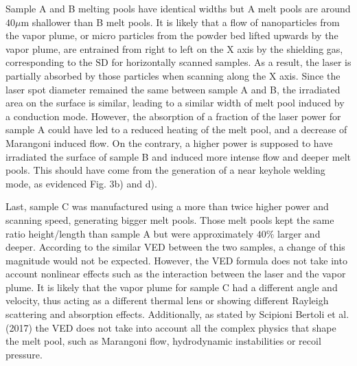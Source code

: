 \documentclass[10pt]{article}
\begin{document}
Sample A and B melting pools have identical widths but A melt pools are around $40 \mu \mathrm{m}$ shallower than B melt pools. It is likely that a flow of nanoparticles from the vapor plume, or micro particles from the powder bed lifted upwards by the vapor plume, are entrained from right to left on the $\mathrm{X}$ axis by the shielding gas, corresponding to the $\mathrm{SD}$ for horizontally scanned samples. As a result, the laser is partially absorbed by those particles when scanning along the $\mathrm{X}$ axis. Since the laser spot diameter remained the same between sample A and B, the irradiated area on the surface is similar, leading to a similar width of melt pool induced by a conduction mode. However, the absorption of a fraction of the laser power for sample A could have led to a reduced heating of the melt pool, and a decrease of Marangoni induced flow. On the contrary, a higher power is supposed to have irradiated the surface of sample B and induced more intense flow and deeper melt pools. This should have come from the generation of a near keyhole welding mode, as evidenced Fig. 3b) and d).

Last, sample $\mathrm{C}$ was manufactured using a more than twice higher power and scanning speed, generating bigger melt pools. Those melt pools kept the same ratio height/length than sample A but were approximately $40 \%$ larger and deeper. According to the similar VED between the two samples, a change of this magnitude would not be expected. However, the VED formula does not take into account nonlinear effects such as the interaction between the laser and the vapor plume. It is likely that the vapor plume for sample $\mathrm{C}$ had a different angle and velocity, thus acting as a different thermal lens or showing different Rayleigh scattering and absorption effects. Additionally, as stated by Scipioni Bertoli et al. (2017) the VED does not take into account all the complex physics that shape the melt pool, such as Marangoni flow, hydrodynamic instabilities or recoil pressure.
\end{document}
